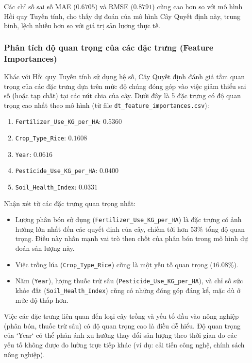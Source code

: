 Các chỉ số sai số MAE ($0.6705$) và RMSE ($0.8791$) cũng cao hơn so với mô hình Hồi quy Tuyến tính, cho thấy dự đoán của mô hình Cây Quyết định này, trung bình, lệch nhiều hơn so với giá trị sản lượng thực tế.

\subsubsection{Phân tích độ quan trọng của các đặc trưng (Feature Importances)}
\label{subsubsec:dt_feature_importances}

Khác với Hồi quy Tuyến tính sử dụng hệ số, Cây Quyết định đánh giá tầm quan trọng của các đặc trưng dựa trên mức độ chúng đóng góp vào việc giảm thiểu sai số (hoặc tạp chất) tại các nút chia của cây. Dưới đây là 5 đặc trưng có độ quan trọng cao nhất theo mô hình (từ file \texttt{dt\_feature\_importances.csv}):

\begin{enumerate}
    \item \texttt{Fertilizer\_Use\_KG\_per\_HA}: $0.5360$
    \item \texttt{Crop\_Type\_Rice}: $0.1608$
    \item \texttt{Year}: $0.0616$
    \item \texttt{Pesticide\_Use\_KG\_per\_HA}: $0.0400$
    \item \texttt{Soil\_Health\_Index}: $0.0331$
\end{enumerate}

Nhận xét từ các đặc trưng quan trọng nhất:
\begin{itemize}
    \item Lượng phân bón sử dụng (\texttt{Fertilizer\_Use\_KG\_per\_HA}) là đặc trưng có ảnh hưởng lớn nhất đến các quyết định của cây, chiếm tới hơn $53\%$ tổng độ quan trọng. Điều này nhấn mạnh vai trò then chốt của phân bón trong mô hình dự đoán sản lượng này.
    \item Việc trồng lúa (\texttt{Crop\_Type\_Rice}) cũng là một yếu tố quan trọng ($16.08\%$).
    \item Năm (\texttt{Year}), lượng thuốc trừ sâu (\texttt{Pesticide\_Use\_KG\_per\_HA}), và chỉ số sức khỏe đất (\texttt{Soil\_Health\_Index}) cũng có những đóng góp đáng kể, mặc dù ở mức độ thấp hơn.
\end{itemize}
Việc các đặc trưng liên quan đến loại cây trồng và yếu tố đầu vào nông nghiệp (phân bón, thuốc trừ sâu) có độ quan trọng cao là điều dễ hiểu. Độ quan trọng của `Year` có thể phản ánh xu hướng thay đổi sản lượng theo thời gian do các yếu tố không được đo lường trực tiếp khác (ví dụ: cải tiến công nghệ, chính sách nông nghiệp).

